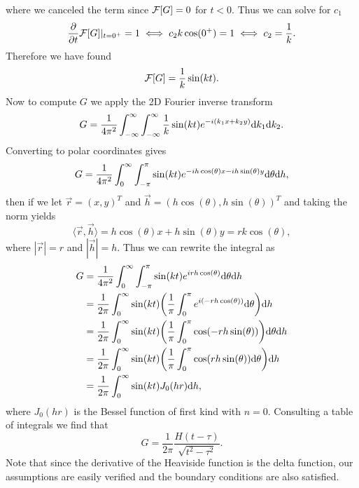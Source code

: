 \documentclass[12pt]{report}
\begin{document}
\begin{solution}
\begin{enumerate}
\[        \]
        where we canceled the term since ${\mathcal{F}}[G] = 0$ for $t<0$. Thus we can solve for $c_1$ 
        \[
            \frac{\partial }{\partial t}{\mathcal{F}}[G]|_{t=0^+} = 1 \iff c_2k\cos(0^+) = 1 \iff c_2 = \frac{1}{k}.
        \]
        Therefore we have found
        \[ 
            {\mathcal{F}}[G] = \frac{1}{k}\sin(kt).
        \]
        Now to compute $G$ we apply the 2D Fourier inverse transform
        \[
            G = \frac{1}{4\pi^2}\int_{-\infty}^{\infty}\int_{-\infty}^{\infty} \frac{1}{k}\sin(kt)e^{-i(k_1x + k_2y)}{\mathrm{d}} k_1 {\mathrm{d}} k_2.
        \]
        Converting to polar coordinates gives
        \[
            G = \frac{1}{4\pi^2}\int_0^\infty\int_{-\pi}^{\pi}\sin(k t)e^{-ih\cos(\theta)x-ih\sin(\theta)y}{\mathrm{d}} \theta {\mathrm{d}} h,
        \]
        then if we let $\vec{r} = (x,y)^T$ and $\vec{h} = (h\cos(\theta),h\sin(\theta))^T$ and taking the norm yields
        \[
            \langle \vec{r}, \vec{h}\rangle = h\cos(\theta)x+h\sin(\theta)y = r k \cos(\theta),
        \]
        where $|\vec{r}| = r$ and $|\vec{h}| = h$. Thus we can rewrite the integral as
        \begin{align*}
            G &= \frac{1}{4\pi^2}\int_0^\infty \int_{-\pi}^\pi \sin(kt)e^{irh\cos(\theta)}{\mathrm{d}} \theta {\mathrm{d}} h\\
            &=\frac{1}{2\pi}\int_0^\infty \sin(kt){\left(\frac{1}{\pi}\int_0^\pi e^{i(-rh\cos(\theta))}{\mathrm{d}} \theta\right)}{\mathrm{d}} h\\
            &=\frac{1}{2\pi}\int_0^\infty \sin(kt){\left(\frac{1}{\pi}\int_0^\pi \cos(-rh\sin(\theta))\right)}{\mathrm{d}} \theta{\mathrm{d}} h\\
            &=\frac{1}{2\pi}\int_0^\infty \sin(kt){\left(\frac{1}{\pi}\int_0^\pi \cos(rh\sin(\theta)){\mathrm{d}} \theta\right)}{\mathrm{d}} h\\
            &=\frac{1}{2\pi}\int_0^\infty \sin(kt)J_0(hr){\mathrm{d}} h,\\
        \end{align*}
        where $J_0(hr)$ is the Bessel function of first kind with $n=0$. Consulting a table of integrals we find that
        \[
            G = \frac{1}{2\pi} \frac{H(t -\tau)}{\sqrt{t^2 - \tau^2}}.
        \]
        Note that since the derivative of the Heaviside function is the delta function, our assumptions are easily verified and the boundary conditions are also satisfied. 



\end{enumerate}
\end{solution}
\end{document}
